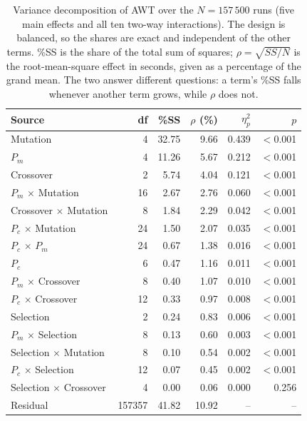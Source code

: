 \begin{table}[t]
\centering
\small
\caption{Variance decomposition of AWT over the $N=157\,500$ runs (five main effects and all ten two-way interactions). The design is
balanced, so the shares are exact and independent of the other terms.
\%SS is the share of the total sum of squares; $\rho=\sqrt{SS/N}$ is the
root-mean-square effect in seconds, given as a percentage of the grand
mean. The two answer different questions: a term's \%SS falls whenever
another term grows, while $\rho$ does not.}
\label{tab:anova}
\begin{tabular}{lrrrrr}
\toprule
Source & df & \%SS & $\rho$ (\%) & $\eta_p^2$ & $p$\\
\midrule
Mutation & 4 & 32.75 & 9.66 & 0.439 & $<$0.001\\
$P_m$ & 4 & 11.26 & 5.67 & 0.212 & $<$0.001\\
Crossover & 2 & 5.74 & 4.04 & 0.121 & $<$0.001\\
$P_m$ $\times$ Mutation & 16 & 2.67 & 2.76 & 0.060 & $<$0.001\\
Crossover $\times$ Mutation & 8 & 1.84 & 2.29 & 0.042 & $<$0.001\\
$P_c$ $\times$ Mutation & 24 & 1.50 & 2.07 & 0.035 & $<$0.001\\
$P_c$ $\times$ $P_m$ & 24 & 0.67 & 1.38 & 0.016 & $<$0.001\\
$P_c$ & 6 & 0.47 & 1.16 & 0.011 & $<$0.001\\
$P_m$ $\times$ Crossover & 8 & 0.40 & 1.07 & 0.010 & $<$0.001\\
$P_c$ $\times$ Crossover & 12 & 0.33 & 0.97 & 0.008 & $<$0.001\\
Selection & 2 & 0.24 & 0.83 & 0.006 & $<$0.001\\
$P_m$ $\times$ Selection & 8 & 0.13 & 0.60 & 0.003 & $<$0.001\\
Selection $\times$ Mutation & 8 & 0.10 & 0.54 & 0.002 & $<$0.001\\
$P_c$ $\times$ Selection & 12 & 0.07 & 0.45 & 0.002 & $<$0.001\\
Selection $\times$ Crossover & 4 & 0.00 & 0.06 & 0.000 & 0.256\\
\midrule
Residual & 157357 & 41.82 & 10.92 & -- & --\\
\bottomrule
\end{tabular}
\end{table}
